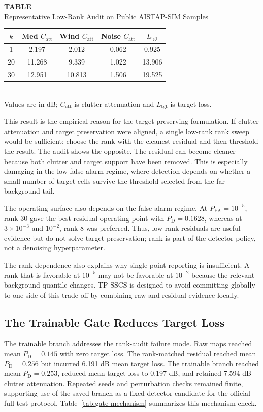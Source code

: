\documentclass[journal]{IEEEtran}
\newcommand{\SingleColumnTableBlock}[3]{%
  \begin{center}
  \begin{minipage}{\columnwidth}
  \centering
  \refstepcounter{table}\label{#1}%
  {\footnotesize\textbf{TABLE~\thetable}}\\[-0.2em]
  {\scriptsize #2}\\[0.35em]
  #3%
  \end{minipage}
  \end{center}
  \vspace{-0.05em}
}
\begin{document}
\SingleColumnTableBlock{tab:lowrank-audit}{Representative Low-Rank Audit on Public AISTAP-SIM Samples}
{{\scriptsize
\setlength{\tabcolsep}{3.0pt}
\renewcommand{\arraystretch}{1.04}
\begin{tabular}{@{}ccccc@{}}
\toprule
$k$ & Med $C_{\mathrm{att}}$ & Wind $C_{\mathrm{att}}$ & Noise $C_{\mathrm{att}}$ & $L_{\mathrm{tgt}}$ \\
\midrule
1  & 2.197  & 2.012  & 0.062 & 0.925  \\
20 & 11.268 & 9.339  & 1.022 & 13.906 \\
30 & 12.951 & 10.813 & 1.506 & 19.525 \\
\bottomrule
\end{tabular}\\[0.1em]
\scriptsize Values are in dB; $C_{\mathrm{att}}$ is clutter attenuation and $L_{\mathrm{tgt}}$ is target loss.
}}

This result is the empirical reason for the target-preserving formulation. If clutter attenuation and target preservation were aligned, a single low-rank rank sweep would be sufficient: choose the rank with the cleanest residual and then threshold the result. The audit shows the opposite. The residual can become cleaner because both clutter and target support have been removed. This is especially damaging in the low-false-alarm regime, where detection depends on whether a small number of target cells survive the threshold selected from the far background tail.

The operating surface also depends on the false-alarm regime. At $P_{\mathrm{FA}}=10^{-5}$, rank 30 gave the best residual operating point with $P_{\mathrm{D}}=0.1628$, whereas at $3\times10^{-3}$ and $10^{-2}$, rank 8 was preferred. Thus, low-rank residuals are useful evidence but do not solve target preservation; rank is part of the detector policy, not a denoising hyperparameter.

The rank dependence also explains why single-point reporting is insufficient. A rank that is favorable at $10^{-5}$ may not be favorable at $10^{-2}$ because the relevant background quantile changes. TP-SSCS is designed to avoid committing globally to one side of this trade-off by combining raw and residual evidence locally.

\subsection{The Trainable Gate Reduces Target Loss}

The trainable branch addresses the rank-audit failure mode. Raw maps reached mean $P_{\mathrm{D}}=0.145$ with zero target loss. The rank-matched residual reached mean $P_{\mathrm{D}}=0.256$ but incurred 6.191 dB mean target loss. The trainable branch reached mean $P_{\mathrm{D}}=0.253$, reduced mean target loss to 0.197 dB, and retained 7.594 dB clutter attenuation. Repeated seeds and perturbation checks remained finite, supporting use of the saved branch as a fixed detector candidate for the official full-test protocol. Table~\ref{tab:gate-mechanism} summarizes this mechanism check.
\end{document}
